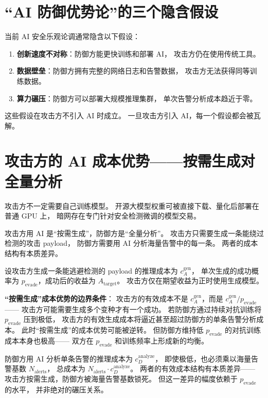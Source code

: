 \documentclass[11pt,a4paper]{article}
\begin{document}
\section{“AI 防御优势论”的三个隐含假设}

当前 AI 安全乐观论调通常隐含以下假设：

\begin{enumerate}[label=(\arabic*)]
    \item \textbf{创新速度不对称}：防御方能更快训练和部署 AI，
          攻击方仍在使用传统工具。
    \item \textbf{数据壁垒}：防御方拥有完整的网络日志和告警数据，
          攻击方无法获得同等训练数据。
    \item \textbf{算力碾压}：防御方可以部署大规模推理集群，
          单次告警分析成本趋近于零。
\end{enumerate}

这些假设在攻击方不引入 AI 时成立。
一旦攻击方引入 AI，每一个假设都会被瓦解。

\section{攻击方的 AI 成本优势——按需生成对全量分析}

攻击方不一定需要自己训练模型。
开源大模型权重可被直接下载、量化后部署在普通 GPU 上，
暗网存在专门针对安全检测微调的模型交易。

攻击方用 AI 是“按需生成”，防御方是“全量分析”。
攻击方只需要生成一条能绕过检测的攻击 payload，
防御方需要用 AI 分析海量告警中的每一条。
两者的成本结构有本质差异。

设攻击方生成一条能逃避检测的 payload 的推理成本为 \(c_A^{\text{gen}}\)，
单次生成的成功概率为 \(p_{\text{evade}}\)，成功后的收益为 \(A_{\text{target}}\)。
攻击方仅在期望收益为正时使用生成模型。

\textbf{“按需生成”成本优势的边界条件}：
攻击方的有效成本不是 \(c_A^{\text{gen}}\)，而是 \(c_A^{\text{gen}} / p_{\text{evade}}\)——
攻击方可能需要生成多个变种才有一个成功。
若防御方通过持续对抗训练将 \(p_{\text{evade}}\) 压到极低，
攻击方的有效生成成本将逼近甚至超过防御方的单条告警分析成本。
此时“按需生成”的成本优势可能被逆转。
但防御方维持低 \(p_{\text{evade}}\) 的对抗训练成本本身也极高——
双方在 \(p_{\text{evade}}\) 和训练频率上形成新的均衡。

防御方用 AI 分析单条告警的推理成本为 \(c_D^{\text{analyze}}\)，
即使极低，也必须乘以海量告警基数 \(N_{\text{alerts}}\)，
总成本为 \(N_{\text{alerts}} \cdot c_D^{\text{analyze}}\)。
两者的有效成本结构有本质差异——
攻击方按需生成，防御方被海量告警基数锁死。
但这一差异的幅度依赖于 \(p_{\text{evade}}\) 的水平，
并非绝对的碾压关系。
\end{document}

